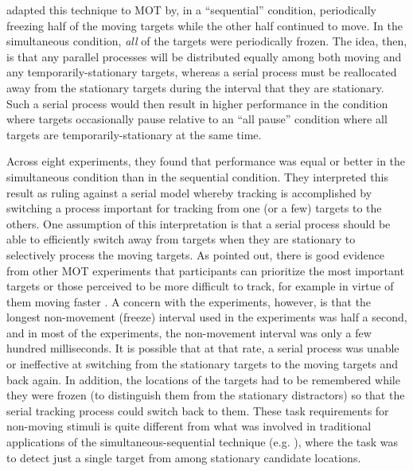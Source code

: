 \documentclass[
]{book}
\begin{document}
\citet{howeDistinguishingParallelSerial2010} adapted this technique to MOT by, in a ``sequential'' condition, periodically freezing half of the moving targets while the other half continued to move. In the simultaneous condition, \emph{all} of the targets were periodically frozen. The idea, then, is that any parallel processes will be distributed equally among both moving and any temporarily-stationary targets, whereas a serial process must be reallocated away from the stationary targets during the interval that they are stationary. Such a serial process would then result in higher performance in the condition where targets occasionally pause relative to an ``all pause'' condition where all targets are temporarily-stationary at the same time.

Across eight experiments, they found that performance was equal or better in the simultaneous condition than in the sequential condition. They interpreted this result as ruling against a serial model whereby tracking is accomplished by switching a process important for tracking from one (or a few) targets to the others. One assumption of this interpretation is that a serial process should be able to efficiently switch away from targets when they are stationary to selectively process the moving targets. As \citet{howeDistinguishingParallelSerial2010} pointed out, there is good evidence from other MOT experiments that participants can prioritize the most important targets or those perceived to be more difficult to track, for example in virtue of them moving faster \citep{chenResourceDemandsObject2013, croweGoaldirectedUnequalAttention2019}. A concern with the \citet{howeDistinguishingParallelSerial2010} experiments, however, is that the longest non-movement (freeze) interval used in the experiments was half a second, and in most of the experiments, the non-movement interval was only a few hundred milliseconds. It is possible that at that rate, a serial process was unable or ineffective at switching from the stationary targets to the moving targets and back again. In addition, the locations of the targets had to be remembered while they were frozen (to distinguish them from the stationary distractors) so that the serial tracking process could switch back to them. These task requirements for non-moving stimuli is quite different from what was involved in traditional applications of the simultaneous-sequential technique (e.g. \citet{shiffrinVisualProcessingCapacity1972}), where the task was to detect just a single target from among stationary candidate locations.
\end{document}
